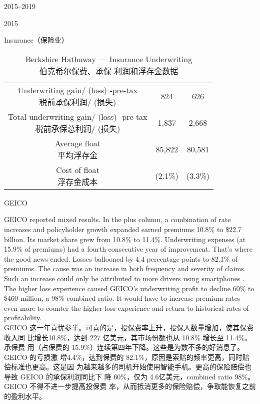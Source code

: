 \begin{chapter}{2015--2019}
\begin{section}{2015}
\begin{subsection}{Insurance（保险业）}
\begin{table}[!htbp]
\begin{center}
\begin{tabular}{ccc}
      \makecell[c]{Underwriting gain/ (loss) -pre-tax \\ 税前承保利润/ (损失)} & 824 & 626 \\
      \makecell[c]{Total underwriting gain/ (loss) -pre-tax \\ 税前承保总利润/ (损失)} & 1,837 & 2,668 \\
      \makecell[c]{Average float \\ 平均浮存金} & 85,822 & 80,581 \\
      \makecell[c]{Cost of float \\ 浮存金成本} & (2.1\%) & (3.3\%) \\
      \bottomrule
    \end{tabular}
    \caption{Berkshire Hathaway --- Insurance Underwriting \\ 伯克希尔保费、承保
      利润和浮存金数据}
  \end{center}
\end{table}
\end{subsection}

\begin{subsection}{GEICO}
\begin{verseparallel}
  {
    GEICO reported mixed results. In the plus column, a combination of rate
    increases and policyholder growth expanded earned premiums 10.8\% to \$22.7
    billion. Its market share grew from 10.8\% to 11.4\%. Underwriting expenses
    (at 15.9\% of premiums) had a fourth consecutive year of improvement.
    That's where the good news ended. Losses ballooned by 4.4 percentage points
    to 82.1\% of premiums. The cause was an increase in both frequency and
    severity of claims. Such an increase could only be attributed to more
    drivers using smartphones . The higher loss
    experience caused GEICO's underwriting profit to decline 60\% to \$460
    million, a 98\% combined ratio. It would have to increase premium rates even
    more to counter the higher loss experience and return to historical rates of
    profitability. \\
  }
  {
    GEICO 这一年喜忧参半。可喜的是，投保费率上升，投保人数量增加，使其保费收入同
    比增长10.8\%，达到 227 亿美元，其市场份额也从 10.8\% 增长至 11.4\%。承保费
    用（占保费的 15.9\%）连续第四年下降。这些是为数不多的好消息了。GEICO 的亏损激
    增4.4\%，达到保费的 82.1\%，原因是索赔的频率更高，同时赔偿标准也更高。这是因
    为越来越多的司机开始使用智能手机。更高的保险赔偿也导致 GEICO 的承保利润同比下
    降 60\%，仅为 4.6亿美元，combined ratio 98\%。GEICO 不得不进一步提高投保费
    率，从而抵消更多的保险赔偿，争取能恢复之前的盈利水平。
  }
\end{verseparallel}
\end{subsection}


\end{section}
\end{chapter}
